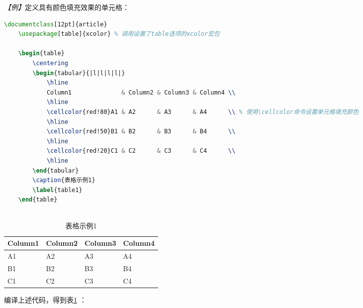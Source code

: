\emph{【例】}定义具有颜色填充效果的单元格：
\begin{lstlisting}[language=TeX]
    \documentclass[12pt]{article}
    \usepackage[table]{xcolor} % 调用设置了table选项的xcolor宏包
    
    \begin{table}
        \centering
        \begin{tabular}{|l|l|l|l|}
            \hline
            Column1              & Column2 & Column3 & Column4 \\
            \hline
            \cellcolor{red!80}A1 & A2      & A3      & A4      \\ % 使用\cellcolor命令设置单元格填充颜色
            \hline
            \cellcolor{red!50}B1 & B2      & B3      & B4      \\
            \hline
            \cellcolor{red!20}C1 & C2      & C3      & C4      \\
            \hline
        \end{tabular}
        \caption{表格示例1}
        \label{table1}
    \end{table}
    
\end{lstlisting}

\begin{table}
    \centering
    \begin{tabular}{|l|l|l|l|}
        \hline
        Column1              & Column2 & Column3 & Column4 \\
        \hline
        \cellcolor{red!80}A1 & A2      & A3      & A4      \\ %
        \hline
        \cellcolor{red!50}B1 & B2      & B3      & B4      \\
        \hline
        \cellcolor{red!20}C1 & C2      & C3      & C4      \\
        \hline
    \end{tabular}
    \caption{表格示例1}
    \label{table1}
\end{table}
编译上述代码，得到表\ref{table1} ：

